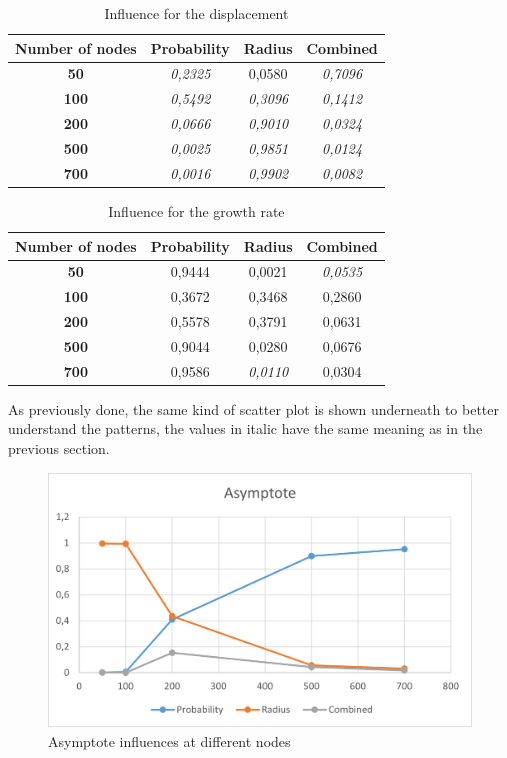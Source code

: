 \begin{table}[H]
\centering
\begin{tabular}{|c|c|c|c|}
\hline
\textbf{Number of   nodes} & \textbf{Probability} & \textbf{Radius} & \textbf{Combined} \\ \hline
\textbf{50} & \textit{0,2325} & 0,0580 & \textit{0,7096} \\ \hline
\textbf{100} & \textit{0,5492} & \textit{0,3096} & \textit{0,1412} \\ \hline
\textbf{200} & \textit{0,0666} & \textit{0,9010} & \textit{0,0324} \\ \hline
\textbf{500} & \textit{0,0025} & \textit{0,9851} & \textit{0,0124} \\ \hline
\textbf{700} & \textit{0,0016} & \textit{0,9902} & \textit{0,0082} \\ \hline
\end{tabular}
\caption{Influence for the displacement}
\end{table}




\begin{table}[H]\label{tab:Growth}
\centering
\begin{tabular}{|c|c|c|c|}
\hline
\textbf{Number of   nodes} & \textbf{Probability} & \textbf{Radius} & \textbf{Combined} \\ \hline
\textbf{50} & 0,9444 & 0,0021 & \textit{0,0535} \\ \hline
\textbf{100} & 0,3672 & 0,3468 & 0,2860 \\ \hline
\textbf{200} & 0,5578 & 0,3791 & 0,0631 \\ \hline
\textbf{500} & 0,9044 & 0,0280 & 0,0676 \\ \hline
\textbf{700} & 0,9586 & \textit{0,0110} & 0,0304 \\ \hline
\end{tabular}
\caption{Influence for the growth rate}
\end{table}

As previously done, the same kind of scatter plot is shown underneath to better understand the patterns, the values in italic have the same meaning as in the previous section.

\begin{figure}[H]\label{pic:AsymptoteNodes}
\centering
    \includegraphics[width= 1\textwidth]{./images/AsymptoteWithNodes.png}
    \caption{Asymptote influences at different nodes}

\end{figure}

